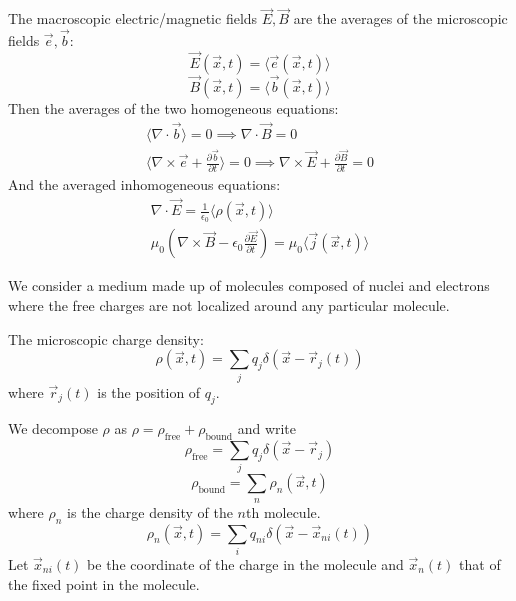 \documentclass{article}
\begin{document}
	The macroscopic electric/magnetic fields $\vec{E}, \vec{B}$ are the averages of the microscopic fields $\vec{e}, \vec{b}$:
	\begin{equation}
		\vec{E}(\vec{x},t) = \langle \vec{e}(\vec{x},t) \rangle
	\end{equation}
	\begin{equation}
		\vec{B}(\vec{x},t) = \langle \vec{b}(\vec{x},t) \rangle
	\end{equation}
	Then the averages of the two homogeneous equations:
	\begin{gather}
		\langle \nabla \cdot \vec{b} \rangle = 0 \implies \nabla \cdot \vec{B} = 0 \\
		\langle \nabla \times \vec{e} + \frac{\partial \vec{b}}{\partial t} \rangle = 0 \implies \nabla \times \vec{E} + \frac{\partial \vec{B}}{\partial t} = 0
	\end{gather}
	And the averaged inhomogeneous equations:
	\begin{gather}
		\nabla \cdot \vec{E} = \frac{1}{\epsilon_0} \langle \rho(\vec{x},t) \rangle \\
		\mu_0(\nabla \times \vec{B} - \epsilon_0 \frac{\partial \vec{E}}{\partial t}) = \mu_0 \langle \vec{j}(\vec{x},t) \rangle
	\end{gather}
	
	We consider a medium made up of molecules composed of nuclei and electrons where the free charges are not localized around any particular molecule.
	
	The microscopic charge density:
	\begin{equation}
		\rho(\vec{x},t) = \sum_j q_j \delta(\vec{x} - \vec{r}_j(t))
	\end{equation}
	where $\vec{r}_j(t)$ is the position of $q_j$.
	
	We decompose $\rho$ as $\rho = \rho_{\text{free}} + \rho_{\text{bound}}$ and write
	\begin{equation}
		\rho_{\text{free}} = \sum_j q_j \delta(\vec{x}-\vec{r}_j)
	\end{equation}
	\begin{equation}
		\rho_{\text{bound}} = \sum_n \rho_n(\vec{x},t)
	\end{equation}
	where $\rho_n$ is the charge density of the $n$th molecule.
	\begin{equation}
		\rho_n(\vec{x},t) = \sum_i q_{ni} \delta(\vec{x} - \vec{x}_{ni}(t))
	\end{equation}
	Let $\vec{x}_{ni}(t)$ be the coordinate of the charge in the molecule and $\vec{x}_n(t)$ that of the fixed point in the molecule.
	
\end{document}
